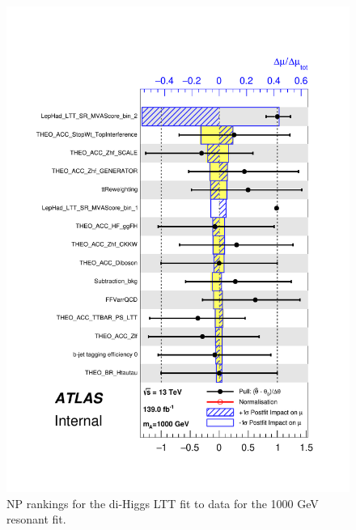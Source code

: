    \begin{figure}
   \centering
   \includegraphics[width=.8\textwidth]{figures/results/HH/LepHad/pulls_SigXsecOverSM_1000_LTT.pdf}
   \caption{NP rankings for the di-Higgs \lephad LTT fit to data for the 1000 GeV resonant fit.}
   \label{fig:LepHadPostfitNPRankings2HDM1000LTT}
   \end{figure}
   
